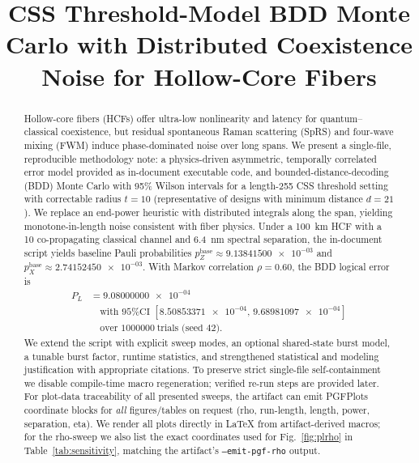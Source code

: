 \documentclass{article}
\newcommand{\nexact}[1]{#1}
\newcommand{\val}[1]{\num[round-mode=figures,round-precision=3]{#1}}
\newcommand{\simL}{100}
\newcommand{\simpcl}{10}
\newcommand{\simsep}{6.4}
\newcommand{\simn}{255}
\newcommand{\simtrials}{1000000}
\newcommand{\simseed}{42}
\newcommand{\simpz}{9.13841500e-03}
\newcommand{\simpx}{2.74152450e-03}
\newcommand{\simrhoB}{0.60}
\newcommand{\simpLB}{9.08000000e-04}
\newcommand{\simpLBlo}{8.50853371e-04}
\newcommand{\simpLBhi}{9.68981097e-04}
\begin{document}
\title{CSS Threshold-Model BDD Monte Carlo with Distributed Coexistence Noise for Hollow-Core Fibers}

\author{}
\maketitle


\begin{abstract}
\begin{sloppypar}
Hollow-core fibers (HCFs) offer ultra-low nonlinearity and latency for quantum--classical coexistence, but residual spontaneous Raman scattering (SpRS) and four-wave mixing (FWM) induce phase-dominated noise over long spans. We present a single-file, reproducible methodology note: a physics-driven asymmetric, temporally correlated error model provided as in-document executable code, and bounded-distance-decoding (BDD) Monte Carlo with 95\% Wilson intervals for a length-\nexact{\simn} CSS threshold setting with correctable radius $t=10$ (representative of designs with minimum distance $d=21$). We replace an end-power heuristic with distributed integrals along the span, yielding monotone-in-length noise consistent with fiber physics. Under a \SI{\simL}{\kilo\meter} HCF with a \SI{\simpcl}{\dBm} co-propagating classical channel and \SI{\simsep}{\nano\meter} spectral separation, the in-document script yields baseline Pauli probabilities $p_Z^{\text{base}}\approx \allowbreak \val{\simpz}$ and $p_X^{\text{base}}\approx \allowbreak \val{\simpx}$. With Markov correlation $\rho=\nexact{\simrhoB}$, the BDD logical error is
\begin{align*}
P_L &= \val{\simpLB} \\
&\quad \text{with 95\% CI }[\val{\simpLBlo},\,\val{\simpLBhi}] \\
&\quad \text{over } \nexact{\simtrials}\ \text{trials (seed \nexact{\simseed})}.
\end{align*}
We extend the script with explicit sweep modes, an optional shared-state burst model, a tunable burst factor, runtime statistics, and strengthened statistical and modeling justification with appropriate citations. To preserve strict single-file self-containment we disable compile-time macro regeneration; verified re-run steps are provided later. For plot-data traceability of all presented sweeps, the artifact can emit PGFPlots coordinate blocks for \emph{all} figures/tables on request (rho, run-length, length, power, separation, eta). We render all plots directly in LaTeX from artifact-derived macros; for the rho-sweep we also list the exact coordinates used for Fig.~\ref{fig:plrho} in Table~\ref{tab:sensitivity}, matching the artifact's \texttt{--emit-pgf-rho} output.
\end{sloppypar}
\end{abstract}
\end{document}
